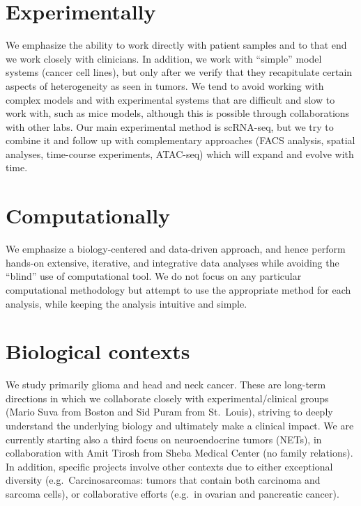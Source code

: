 \documentclass[
]{book}
\begin{document}
\hypertarget{experimentally}{%
\section{Experimentally}\label{experimentally}}

We emphasize the ability to work directly with patient samples and to that end we work closely with clinicians. In addition, we work with ``simple'' model systems (cancer cell lines), but only after we verify that they recapitulate certain aspects of heterogeneity as seen in tumors. We tend to avoid working with complex models and with experimental systems that are difficult and slow to work with, such as mice models, although this is possible through collaborations with other labs. Our main experimental method is scRNA-seq, but we try to combine it and follow up with complementary approaches (FACS analysis, spatial analyses, time-course experiments, ATAC-seq) which will expand and evolve with time.

\hypertarget{computationally}{%
\section{Computationally}\label{computationally}}

We emphasize a biology-centered and data-driven approach, and hence perform hands-on extensive, iterative, and integrative data analyses while avoiding the ``blind'' use of computational tool. We do not focus on any particular computational methodology but attempt to use the appropriate method for each analysis, while keeping the analysis intuitive and simple.

\hypertarget{biological-contexts}{%
\section{Biological contexts}\label{biological-contexts}}

We study primarily glioma and head and neck cancer. These are long-term directions in which we collaborate closely with experimental/clinical groups (Mario Suva from Boston and Sid Puram from St.~Louis), striving to deeply understand the underlying biology and ultimately make a clinical impact. We are currently starting also a third focus on neuroendocrine tumors (NETs), in collaboration with Amit Tirosh from Sheba Medical Center (no family relations). In addition, specific projects involve other contexts due to either exceptional diversity (e.g.~Carcinosarcomas: tumors that contain both carcinoma and sarcoma cells), or collaborative efforts (e.g.~in ovarian and pancreatic cancer).
\end{document}
